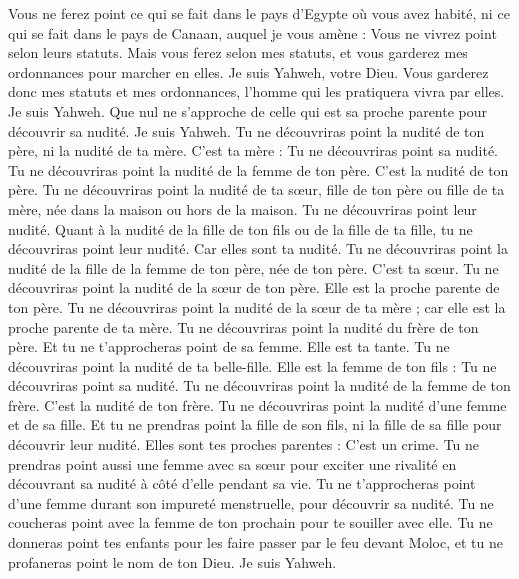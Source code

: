 \begin{multicols}{2}
Vous ne ferez point ce qui se fait dans le pays d'Egypte où vous avez habité, ni ce qui se fait dans le pays de Canaan, auquel je vous amène : Vous ne vivrez point selon leurs statuts.
Mais vous ferez selon mes statuts, et vous garderez mes ordonnances pour marcher en elles. Je suis Yahweh, votre Dieu.
Vous garderez donc mes statuts et mes ordonnances, l'homme qui les pratiquera vivra par elles. Je suis Yahweh.
Que nul ne s'approche de celle qui est sa proche parente pour découvrir sa nudité. Je suis Yahweh.
Tu ne découvriras point la nudité de ton père, ni la nudité de ta mère. C'est ta mère : Tu ne découvriras point sa nudité.
Tu ne découvriras point la nudité de la femme de ton père. C'est la nudité de ton père.
Tu ne découvriras point la nudité de ta sœur, fille de ton père ou fille de ta mère, née dans la maison ou hors de la maison. Tu ne découvriras point leur nudité.
Quant à la nudité de la fille de ton fils ou de la fille de ta fille, tu ne découvriras point leur nudité. Car elles sont ta nudité.
Tu ne découvriras point la nudité de la fille de la femme de ton père, née de ton père. C'est ta sœur.
Tu ne découvriras point la nudité de la sœur de ton père. Elle est la proche parente de ton père.
Tu ne découvriras point la nudité de la sœur de ta mère ; car elle est la proche parente de ta mère.
Tu ne découvriras point la nudité du frère de ton père. Et tu ne t'approcheras point de sa femme. Elle est ta tante.
Tu ne découvriras point la nudité de ta belle-fille. Elle est la femme de ton fils : Tu ne découvriras point sa nudité.
Tu ne découvriras point la nudité de la femme de ton frère. C'est la nudité de ton frère.
Tu ne découvriras point la nudité d'une femme et de sa fille. Et tu ne prendras point la fille de son fils, ni la fille de sa fille pour découvrir leur nudité. Elles sont tes proches parentes : C'est un crime.
Tu ne prendras point aussi une femme avec sa sœur pour exciter une rivalité en découvrant sa nudité à côté d'elle pendant sa vie.
Tu ne t'approcheras point d'une femme durant son impureté menstruelle, pour découvrir sa nudité.
Tu ne coucheras point avec la femme de ton prochain pour te souiller avec elle.
Tu ne donneras point tes enfants pour les faire passer par le feu devant Moloc, et tu ne profaneras point le nom de ton Dieu. Je suis Yahweh.

\end{multicols}
